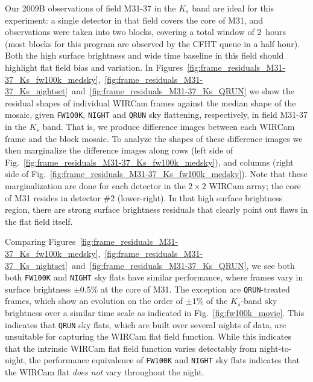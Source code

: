 \documentclass[iop]{emulateapj}
\newcommand{\Fig}[1]{Fig.~\ref{fig:#1}}  %
\begin{document}
Our 2009B observations of field M31-37 in the $K_s$ band are ideal for this experiment: a single detector in that field covers the core of M31, and observations were taken into two blocks, covering a total window of 2~hours (most blocks for this program are observed by the CFHT queue in a half hour).
Both the high surface brightness and wide time baseline in this field should highlight flat field bias and variation.
In Figures~\ref{fig:frame_residuals_M31-37_Ks_fw100k_medsky},~\ref{fig:frame_residuals_M31-37_Ks_nightset}~and~\ref{fig:frame_residuals_M31-37_Ks_QRUN} we show the residual shapes of individual WIRCam frames against the median shape of the mosaic, given \texttt{FW100K}, \texttt{NIGHT} and \texttt{QRUN} sky flattening, respectively, in field M31-37 in the $K_s$ band.
That is, we produce difference images between each WIRCam frame and the block mosaic.
To analyze the shapes of these difference images we then marginalize the difference images along rows (left side of \Fig{frame_residuals_M31-37_Ks_fw100k_medsky}), and columns (right side of \Fig{frame_residuals_M31-37_Ks_fw100k_medsky}).
Note that these marginalization are done for each detector in the $2\times2$ WIRCam array; the core of M31 resides in detector \#2 (lower-right).
In that high surface brightness region, there are strong surface brightness residuals that clearly point out flaws in the flat field itself.

Comparing Figures~\ref{fig:frame_residuals_M31-37_Ks_fw100k_medsky},~\ref{fig:frame_residuals_M31-37_Ks_nightset}~and~\ref{fig:frame_residuals_M31-37_Ks_QRUN}, we see both both \texttt{FW100K} and \texttt{NIGHT} sky flats have similar performance, where frames vary in surface brightness $\pm 0.5\%$ at the core of M31.
The exception are \texttt{QRUN}-treated frames, which show an evolution on the order of $\pm 1\%$ of the $K_s$-band sky brightness over a similar time scale as indicated in \Fig{fw100k_movie}.
This indicates that \texttt{QRUN} sky flats, which are built over several nights of data, are unsuitable for capturing the WIRCam flat field function.
While this indicates that the intrinsic WIRCam flat field function varies detectably from night-to-night, the performance equivalence of \texttt{FW100K} and \texttt{NIGHT} sky flats indicates that the WIRCam flat \emph{does not} vary throughout the night.
\end{document}
